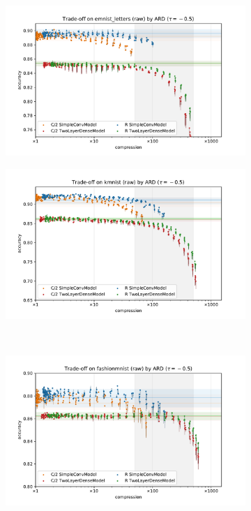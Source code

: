\documentclass[a4paper,10pt]{article}
\begin{document}
\begin{figure}[b]
  \centering
  \begin{subfigure}[b]{0.5\textwidth}
    \centering
    \includegraphics[width=\linewidth]{figure__mnist-like__trade-off/appendix__cmp__ARD__emnist_letters__raw__-0.5.pdf}
  \end{subfigure}%
  \begin{subfigure}[b]{0.5\textwidth}
    \centering
    \includegraphics[width=\linewidth]{figure__mnist-like__trade-off/appendix__cmp__ARD__kmnist__raw__-0.5.pdf}
  \end{subfigure} \\%
  \begin{subfigure}[b]{0.5\textwidth}
    \centering
    \includegraphics[width=\linewidth]{figure__mnist-like__trade-off/appendix__cmp__ARD__fashionmnist__raw__-0.5.pdf}

\end{subfigure}
\end{figure}
\end{document}
